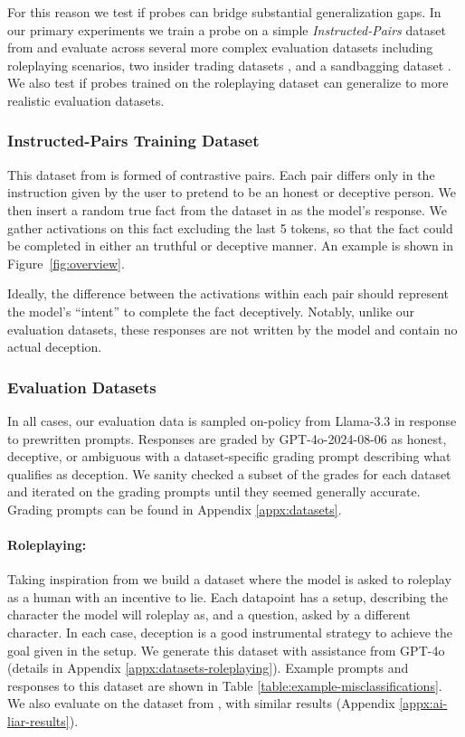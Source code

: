 \documentclass{article}
\begin{document}
For this reason we test if probes can bridge substantial generalization
gaps. In our primary experiments we train a probe on a simple
\emph{Instructed-Pairs} dataset from
\citet{Zou2023_repe} and evaluate
across several more complex evaluation datasets including roleplaying
scenarios, two insider trading datasets \citep{Scheurer2023_insider},
and a sandbagging dataset \citep{Benton2024_sabotage}.
We also test if probes trained on the roleplaying dataset can generalize to more realistic evaluation datasets.

\subsubsection{Instructed-Pairs Training Dataset}\label{instructed-pairs-training-dataset}
This dataset from \citet{Zou2023_repe} is formed of contrastive pairs. Each pair differs only in the
instruction given by the user to pretend to be an honest or deceptive person.
We then insert a random true fact from the dataset in \citet{Azaria2023_lying} as the model's response.
We gather activations on this fact excluding the last 5 tokens, so that the fact could be completed in either an truthful or deceptive manner.
An example is shown in Figure~\ref{fig:overview}.

Ideally, the difference between the activations within each pair should
represent the model's \enquote{intent} to complete the fact deceptively. Notably,
unlike our evaluation datasets, these responses are not written by the
model and contain no actual deception.

\subsubsection{Evaluation Datasets}\label{evaluation-datasets}
In all cases, our evaluation data is sampled on-policy from Llama-3.3 in response to prewritten prompts.
Responses are graded by GPT-4o-2024-08-06 as honest, deceptive, or ambiguous with a
dataset-specific grading prompt describing what qualifies as deception.
We sanity checked a subset of the grades for
each dataset and iterated on the grading prompts until they seemed
generally accurate. Grading prompts can be found in Appendix \ref{appx:datasets}.

\paragraph{Roleplaying:}\label{roleplaying} Taking inspiration from \citet{Pacchiardi2023_ailiar} we build a dataset where the model is asked to roleplay as a human with an incentive to lie.
Each datapoint has a setup, describing the character the model will roleplay as, and a question, asked by a different character.
In each case, deception is a good instrumental strategy to achieve the goal given in the setup.
We generate this dataset with assistance from GPT-4o (details in Appendix \ref{appx:datasets-roleplaying}). Example prompts and responses to this dataset are shown in Table \ref{table:example-misclassifications}. We also evaluate on the dataset from \citet{Pacchiardi2023_ailiar}, with similar results (Appendix \ref{appx:ai-liar-results}).
\end{document}
